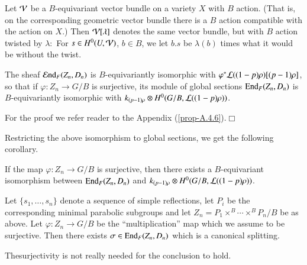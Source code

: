 \begin{definition}\label{chap4-defi4.3.14}
Let $\mathcal{V}$ be a $B$-equivariant vector bundle on a variety $X$ with $B$
action. (That is, on the corresponding geometric vector
bundle there
is a $B$ action compatible with the action on $X$.) Then $\mathcal{V}[\lambda]$
denotes the same vector bundle, but with $B$ action twisted by
$\lambda:$ For $s\in H^{0}(U,\mathcal{V})$, $b\in B$, we let $b.s$ be
$\lambda(b)$ times what it would be without the twist.
\end{definition}

\begin{proposition}\label{chap4-prop4.3.15}
The sheaf $\operatorname{\mathcal{E}nd}_{F}(Z_{n},D_{n})$ is $B$-equivariantly isomorphic
with $\varphi^{*}\mathcal{L}((1-p)\rho)[(p-1)\rho]$, so that if
$\varphi:Z_{n}\to G/B$ is surjective, its module of global sections
$\operatorname{End}_{F}(Z_{n},D_{n})$ is $B$-equivariantly isomorphic with
$k_{(p-1)\rho}\otimes H^{0}(G/B,\mathcal{L}((1-p)\rho))$. 
\end{proposition}

For the proof we refer reader to the Appendix (\ref{prop-A.4.6}).\hfill$\Box$

Restricting the above isomorphism to global sections, we get the
following corollary.

\begin{corollary}\label{chap4-coro4.3.16}
If the map $\varphi:Z_{n}\to G/B$ is surjective, then there exists a
$B$-equivariant isomorphism between $\operatorname{End}_{F}(Z_{n},D_{n})$ and
$k_{(p-1)\rho}\otimes H^{0}(G/B,\mathcal{L}((1-p)\rho))$. 
\end{corollary}

\begin{proposition}\label{chap4-prop4.3.17}
Let $\{s_{1},\ldots,s_{n}\}$ denote a sequence of simple reflections,
let $P_{i}$ be the corresponding minimal parabolic subgroups and let
$Z_{n}=P_{1}\times^{B}\cdots\times^{B}P_{n}/B$ be as above. Let
$\varphi:Z_{n}\to G/B$ be the ``multiplication'' map which we assume
to be surjective. Then there exists $\sigma\in \operatorname{End}_{F}(Z_{n},D_{n})$
which is a canonical splitting. 
\end{proposition}

\begin{remark}\label{chap4-rem4.3.18}
The\pageoriginale surjectivity\label{page45} is not really needed for the conclusion to hold.
\end{remark}

